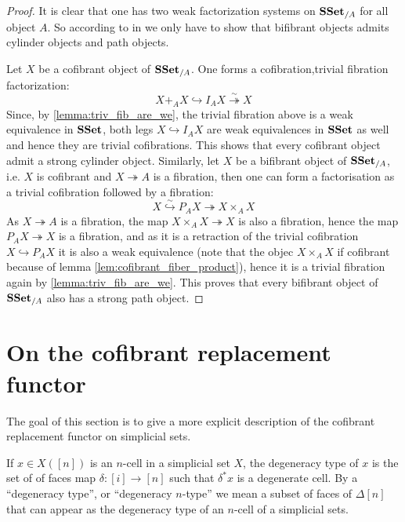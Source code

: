 \documentclass[reqno,10pt,a4paper,oneside,draft]{amsart}
\begin{document}
\begin{proof}

It is clear that one has two weak factorization systems on $\mathbf{SSet}_{/A}$ for all object $A$. So according to  in \cite[Definition~2.1.11]{henry2018wms} we only have to show that bifibrant objects admits cylinder objects and path objects.

Let $X$ be a cofibrant object of $\mathbf{SSet}_{/A}$. One forms a cofibration,trivial fibration factorization:
\[ 
X +_A X \hookrightarrow I_A X \overset{\sim}{\twoheadrightarrow} X 
\]
Since, by  \cref{lemma:triv_fib_are_we}, the trivial fibration above is a weak equivalence in $\mathbf{SSet}$, both legs $X \hookrightarrow I_A X$ are weak equivalences in $\mathbf{SSet}$ as well and hence they are trivial cofibrations. This shows that every cofibrant object admit a strong cylinder object. Similarly, let $X$ be a bifibrant object of $\mathbf{SSet}_{/A}$, i.e. $X$ is cofibrant and $X \twoheadrightarrow A$ is a fibration, then one can form a factorisation as a trivial cofibration followed by a fibration:
\[ 
X \overset{\sim}{\hookrightarrow} P_A X {\twoheadrightarrow} X \times_{A} X 
\]
As $X \twoheadrightarrow A$ is a fibration, the map $X \times_A X \twoheadrightarrow X$ is also a fibration, hence the map $P_A X \twoheadrightarrow X$ is a fibration, and as it is a retraction of the trivial cofibration $X \hookrightarrow P_A X$ it is also a weak equivalence (note that the objec $X \times_A X$ if cofibrant because of lemma \ref{lem:cofibrant_fiber_product}), hence it is a trivial fibration again by \cref{lemma:triv_fib_are_we}. This proves that every bifibrant object of $\mathbf{SSet}_{/A}$ also has a strong path object.
\end{proof}

\newpage

\section{On the cofibrant replacement functor}

The goal of this section is to give a more explicit description of the cofibrant replacement functor on simplicial sets.


\begin{definition}
If $x \in X([n])$ is an $n$-cell in a simplicial set $X$, the degeneracy type of $x$ is the set of of faces map $\delta:[i] \rightarrow [n]$ such that $\delta^* x$ is a degenerate cell. 
By a ``degeneracy type'', or ``degeneracy $n$-type'' we mean a subset of faces of $\Delta[n]$ that can appear as the degeneracy type of an $n$-cell of a simplicial sets.
\end{definition}
\end{document}

